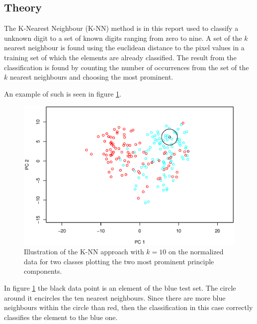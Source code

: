 \subsection{Theory}
The K-Nearest Neighbour (K-NN) method is in this report used to classify a unknown digit to a set of known digits ranging from zero to nine.
A set of the $k$ nearest neighbour is found using the euclidean distance to the pixel values in a training set of which the elements are already classified.
The result from the classification is found by counting the number of occurrences from the set of the $k$ nearest neighbours and choosing the most prominent.


An example of such is seen in figure \ref{fig:knn_illustration}.

\begin{figure}[H]
\centering
\includegraphics[width = 0.8 \textwidth]{graphics/knn_vis}
\caption[Visualization of the K-NN approach.]{Illustration of the K-NN approach with $k = 10$ on the normalized data for two classes plotting the two most prominent principle components.}
\label{fig:knn_illustration}
\end{figure}

In figure \ref{fig:knn_illustration} the black data point is an element of the blue test set.
The circle around it encircles the ten nearest neighbours.
Since there are more blue neighbours within the circle than red, then the classification in this case correctly classifies the element to the blue one.

